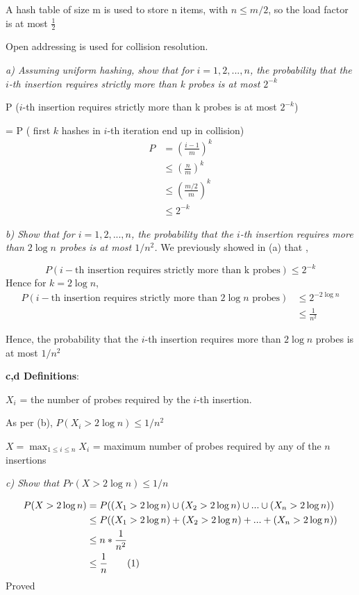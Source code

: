 \documentclass{homeworg}
\newcommand\numberthis{\addtocounter{equation}{1}\tag{\theequation}}
\begin{document}
A hash table of size m is used to store n items, with $n \le m/2$, so the load factor is at most $\frac{1}{2}$

Open addressing is used for collision resolution.

\emph{a) Assuming uniform hashing, show that for $i =1, 2,. .., n$, the probability that the $i$-th insertion requires strictly more than k probes is at most $2^{-k}$}

P ($i$-th insertion requires strictly more than k probes is at most $2^{-k}$)

= P ( first $k$ hashes in $i$-th iteration end up in collision)
\begin{align*}
P &=\left(\frac{i-1}{m}\right)^k\\
&\le \left(\frac{n}{m}\right)^k\\
&\le \left(\frac{m/2}{m}\right)^k\\
&\le 2^{-k}
\end{align*}

\emph{b) Show that for $i =1, 2,. .., n$, the probability that the $i$-th insertion requires more than $2 \log n$ probes is at most $1/n^2$.}
We previously showed in (a) that ,

$$P (i-\text{th insertion requires strictly more than k probes}) \le 2^{-k}$$
Hence for $k = 2 \log n$,
\begin{align*}
    P (i-\text{th insertion requires strictly more than $2 \log n $ probes})&\le 2^{-2 \log n}\\
    &\le \frac{1}{n^2} 
\end{align*}

Hence, the probability that the $i$-th insertion requires more than $2 \log n$ probes is at most $1/n^2$


\textbf{c,d Definitions}:

$X_i$ = the number of probes required by the $i$-th insertion.

As per (b), $P({X_i > 2 \log n}) \le 1/n^2$ 

$X = \max_{1\le i\le n} X_i$ = maximum number of probes required by any of the $n$ insertions

\emph{c) Show that $Pr({X> 2 \log n}) \le 1/n$}

\begin{align*}
    P({X> 2 \log n}) &= P((X_1> 2 \log n) \cup (X_2> 2 \log n) \cup... \cup (X_n> 2 \log n)) \\
    &\le P((X_1> 2 \log n) + (X_2> 2 \log n) +... + (X_n> 2 \log n)) \\
    &\le n \ast  \frac{1}{n^2} \\
    &\le \frac{1}{n} \numberthis \label{eqn_c}
\end{align*}
Proved
\end{document}

